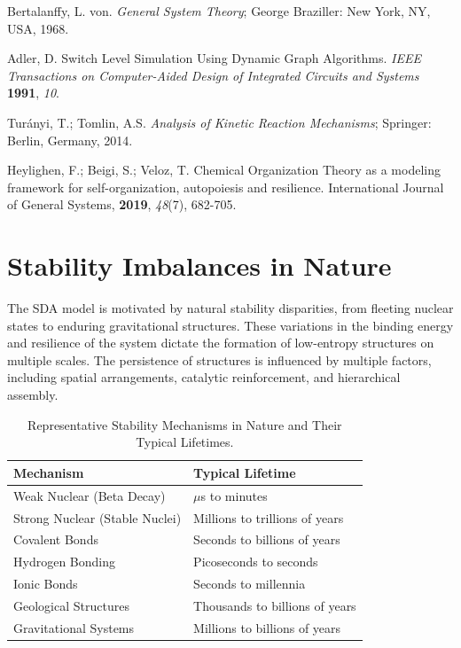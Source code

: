 \documentclass[preprint,12pt]{elsarticle}
\begin{document}
\begin{thebibliography}{999}
Bertalanffy, L. von. \textit{General System Theory}; George Braziller: New York, NY, USA, 1968.

Adler, D. Switch Level Simulation Using Dynamic Graph Algorithms. \textit{IEEE Transactions on Computer-Aided Design of Integrated Circuits and Systems} \textbf{1991}, \textit{10}.

Turányi, T.; Tomlin, A.S. \textit{Analysis of Kinetic Reaction Mechanisms}; Springer: Berlin, Germany, 2014.

Heylighen, F.; Beigi, S.; Veloz, T. Chemical Organization Theory as a modeling framework for self-organization, autopoiesis and resilience. International Journal of General Systems, \textbf{2019}, \textit{48}(7), 682-705.

\end{thebibliography}


\appendix

\section{Stability Imbalances in Nature}

The SDA model is motivated by natural stability disparities, from fleeting nuclear states to enduring gravitational structures. These variations in the binding energy and resilience of the system dictate the formation of low-entropy structures on multiple scales. The persistence of structures is influenced by multiple factors, including spatial arrangements, catalytic reinforcement, and hierarchical assembly.

\begin{table}
\centering
\caption{Representative Stability Mechanisms in Nature and Their Typical Lifetimes.}
\label{tab:binding-forces}
\footnotesize
\begin{tabular}{l l}
\toprule
\textbf{Mechanism} & \textbf{Typical Lifetime} \\
\midrule
Weak Nuclear (Beta Decay) & $\mu$s to minutes \\
Strong Nuclear (Stable Nuclei) & Millions to trillions of years \\
Covalent Bonds & Seconds to billions of years \\
Hydrogen Bonding & Picoseconds to seconds \\
Ionic Bonds & Seconds to millennia \\
Geological Structures & Thousands to billions of years \\
Gravitational Systems & Millions to billions of years \\
\bottomrule
\end{tabular}
\end{table}
\end{document}
